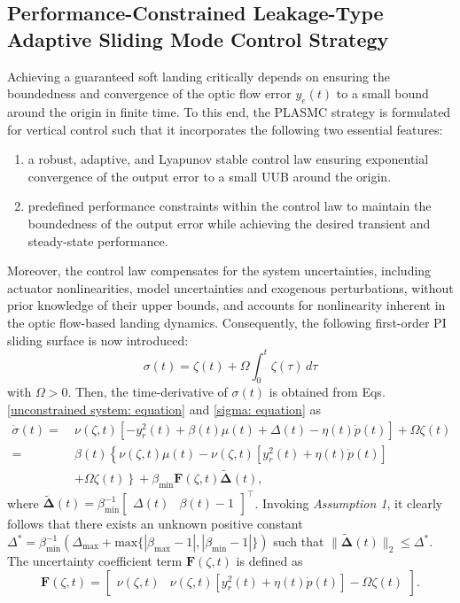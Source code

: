\documentclass{IEEEtaes}
\begin{document}
\subsection{Performance-Constrained Leakage-Type Adaptive Sliding Mode Control Strategy}
\label{adaptive controller: section}
Achieving a guaranteed soft landing critically depends on ensuring the boundedness and convergence of the optic flow error $y_e(t)$ to a small bound around the origin in finite time. To this end, the PLASMC strategy is formulated for vertical control such that it incorporates the following two essential features:
\begin{enumerate}
    \item a robust, adaptive, and Lyapunov stable control law ensuring exponential convergence of the output error to a small UUB around the origin.
    \item predefined performance constraints within the control law to maintain the boundedness of the output error while achieving the desired transient and steady-state performance.
\end{enumerate}
Moreover, the control law compensates for the system uncertainties, including actuator nonlinearities, model uncertainties and exogenous perturbations, without prior knowledge of their upper bounds, and accounts for nonlinearity inherent in the optic flow-based landing dynamics.
Consequently, the following first-order PI sliding surface is now introduced:
\begin{equation} \label{sigma: equation}
    \sigma(t) = \zeta(t) + \Omega \int_{0}^t \zeta(\tau)\,d\tau
\end{equation}
with $\Omega > 0$. Then, the time-derivative of $\sigma(t)$ is obtained from Eqs. \eqref{unconstrained system: equation} and \eqref{sigma: equation} as
\begin{align}
    \label{sigma derivative: equation 1}
    \dot{\sigma}(t) =~& \nu(\zeta,t) \left[{-}y_r^2(t) {+} \beta(t) \mu(t) {+} \Delta(t) {-} \eta(t) \dot{p}(t) \right]+ \Omega\zeta(t) \nonumber\\
    =~& \beta(t)\left\{\nu(\zeta,t)\mu(t)-\nu(\zeta,t)\left[y_r^2(t) {+} \eta(t) \dot{p}(t)\right]\right.\nonumber\\
    &{+}\left.\Omega\zeta(t)\right\}+\beta_{\text{min}}\boldsymbol{F}(\zeta,t)\tilde{\boldsymbol{\Delta}}(t),
\end{align}
where $\tilde{\boldsymbol{\Delta}}(t)=\beta_{\text{min}}^{-1}\begin{bmatrix}
\Delta(t)  & \beta(t){-}1 \end{bmatrix}^{\top}$.
Invoking \textit{Assumption 1}, it clearly follows that there exists an unknown positive constant $\Delta^{*} = \beta_{\text{min}}^{-1} (\Delta_{\text{max}}+\text{max}\{|\beta_{\text{max}}{-}1|,|\beta_{\text{min}}{-}1|\})$ such that $\lVert\tilde{\boldsymbol{\Delta}}(t)\rVert_2\leq\Delta^{*}$.
The uncertainty coefficient term $\boldsymbol{F}(\zeta,t)$ is defined as
\begin{equation}
\boldsymbol{F}(\zeta,t) = \begin{bmatrix}
\nu(\zeta,t) & \nu(\zeta,t)[y_r^2(t) {+} \eta(t) \dot{p}(t)] - \Omega\zeta(t) \end{bmatrix}.
\end{equation}
 
\end{document}
